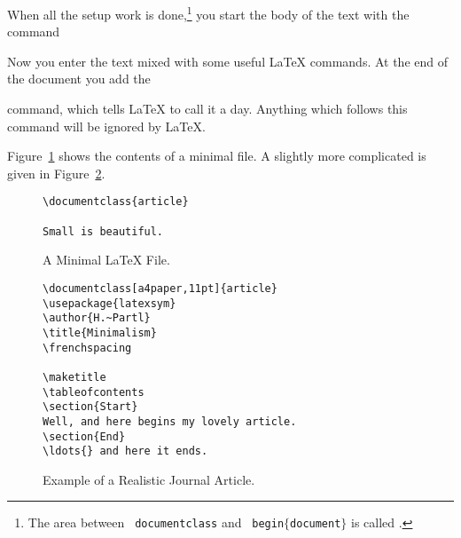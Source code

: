 When all the setup work is done,\footnote{The area between \texttt{\bs
    documentclass} and \texttt{\bs
    begin$\mathtt{\{}$document$\mathtt{\}}$} is called
  \emph{}.} you start the body of the text with the
command

\begin{code}
\verb||
\end{code}

Now you enter the text mixed with some useful \LaTeX{} commands.  At
the end of the document you add the
\begin{code}
\verb||
\end{code}
command, which tells \LaTeX{} to call it a day. Anything which
follows this command will be ignored by \LaTeX.

Figure~\ref{mini} shows the contents of a minimal \LaTeXe{} file. A
slightly more complicated  is given in
Figure~\ref{document}.

\begin{figure}[!bp]
\begin{lined}{6cm}
\begin{verbatim}
\documentclass{article}

Small is beautiful.

\end{verbatim}
\end{lined}
\caption{A Minimal \LaTeX{} File.} \label{mini}
\end{figure}
 
\begin{figure}[!bp]
\begin{lined}{10cm}
\begin{verbatim}
\documentclass[a4paper,11pt]{article}
\usepackage{latexsym}
\author{H.~Partl}
\title{Minimalism}
\frenchspacing

\maketitle
\tableofcontents
\section{Start}
Well, and here begins my lovely article.
\section{End}
\ldots{} and here it ends.

\end{verbatim}
\end{lined}
\caption{Example of a Realistic Journal Article.} \label{document}
\end{figure}
 
